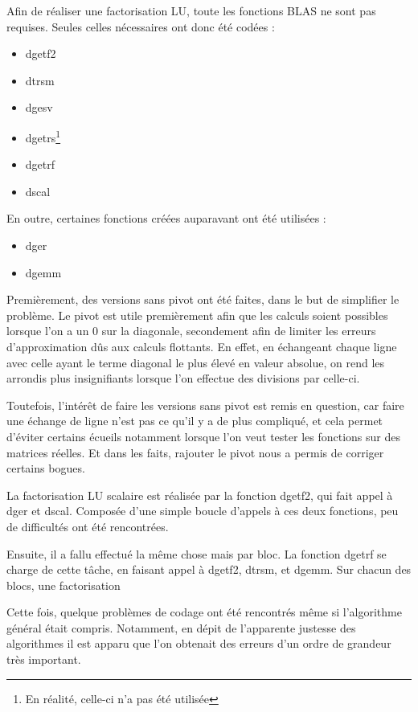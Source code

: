 \documentclass[a4paper,11pt]{article}
\begin{document}
Afin de réaliser une factorisation LU, toute les fonctions BLAS ne sont pas requises. Seules celles nécessaires ont donc été codées :

\begin{itemize}
\item dgetf2
\item dtrsm
\item dgesv
\item dgetrs\footnote{En réalité, celle-ci n'a pas été utilisée}
\item dgetrf
\item dscal
\end{itemize}

En outre, certaines fonctions créées auparavant ont été utilisées : 


\begin{itemize}
\item dger
\item dgemm
\end{itemize}

Premièrement, des versions sans pivot ont été faites, dans le but de simplifier le problème. Le pivot est utile premièrement afin que les calculs soient possibles lorsque l'on a un $0$ sur la diagonale, secondement afin de limiter les erreurs d'approximation dûs aux calculs flottants. En effet, en échangeant chaque ligne avec celle ayant le terme diagonal le plus élevé en valeur absolue, on rend les arrondis plus insignifiants lorsque l'on effectue des divisions par celle-ci.

Toutefois, l'intérêt de faire les versions sans pivot est remis en question, car faire une échange de ligne n'est pas ce qu'il y a de plus compliqué, et cela permet d'éviter certains écueils notamment lorsque l'on veut tester les fonctions sur des matrices réelles. Et dans les faits, rajouter le pivot nous a permis de corriger certains bogues.

La factorisation LU scalaire est réalisée par la fonction dgetf2, qui fait appel à dger et dscal. Composée d'une simple boucle d'appels à ces deux fonctions, peu de difficultés ont été rencontrées.

Ensuite, il a fallu effectué la même chose mais par bloc. La fonction dgetrf se charge de cette tâche, en faisant appel à dgetf2, dtrsm, et dgemm. Sur chacun des blocs, une factorisation %

Cette fois, quelque problèmes de codage ont été rencontrés même si l'algorithme général était compris. Notamment, en dépit de l'apparente justesse des algorithmes il est apparu que l'on obtenait des erreurs d'un ordre de grandeur très important.
\end{document}
